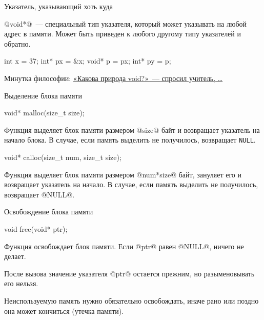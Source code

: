 \begin{frame}[fragile]{Указатель, указывающий хоть куда}

  @void*@~--- специальный тип указателя, который может указывать на любой адрес
  в памяти. Может быть приведен к любого другому типу указателей и обратно.

  \begin{clisting}[escapechar=\!]
    int x = 37;
    int* px = &x;
    void* p = px;
    int* py = p;
  \end{clisting}

  \pause
  Минутка философии: \href{%
    http://thecodelesscode.com/case/5?lang=ru%
  }{%
    «Какова природа void?»~--- спросил учитель, …
  }

\end{frame}

\begin{frame}[fragile]{Выделение блока памяти}

  \begin{clisting}[basicstyle=\ttfamily]
    void* malloc(size_t size);
  \end{clisting}
  \revertListingParskip
  Функция выделяет блок памяти размером @size@ байт и возвращает указатель на
  начало блока. \alert<2>{В случае, если память выделить не получилось,
  возвращает \texttt{NULL}.}

  \begin{clisting}[basicstyle=\ttfamily]
    void* calloc(size_t num, size_t size);
  \end{clisting}
  \revertListingParskip
  Функция выделяет блок памяти размером @num*size@ байт, зануляет его и
  возвращает указатель на начало. В случае, если память выделить не получилось,
  возвращает @NULL@.


\end{frame}

\begin{frame}[fragile]{Освобождение блока памяти}

  \begin{clisting}[basicstyle=\ttfamily]
    void free(void* ptr);
  \end{clisting}

  Функция освобождает блок памяти. Если @ptr@ равен @NULL@, ничего не делает.

  \pause
  После вызова значение указателя @ptr@ остается прежним, но разыменовывать его
  нельзя.

  \pause
  Неиспользуемую память нужно обязательно освобождать, иначе рано или поздно
  она может кончиться (утечка памяти).



\end{frame}

